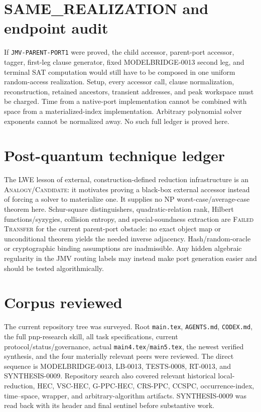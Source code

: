 \documentclass[11pt]{article}
\newcommand{\status}[1]{\textsc{#1}}
\begin{document}
\section{SAME\_REALIZATION and endpoint audit}

If \texttt{JMV-PARENT-PORT1} were proved, the child accessor, parent-port
accessor, tagger, first-leg clause generator, fixed MODELBRIDGE-0013 second
leg, and terminal SAT computation would still have to be composed in one
uniform random-access realization.  Setup, every accessor call, clause
normalization, reconstruction, retained ancestors, transient addresses, and
peak workspace must be charged.  Time from a native-port implementation
cannot be combined with space from a materialized-index implementation.
Arbitrary polynomial solver exponents cannot be normalized away.  No such
full ledger is proved here.

\section{Post-quantum technique ledger}

The LWE lesson of external, construction-defined reduction infrastructure is
an \status{Analogy/Candidate}: it motivates proving a black-box external
accessor instead of forcing a solver to materialize one.  It supplies no NP
worst-case/average-case theorem here.  Schur-square distinguishers,
quadratic-relation rank, Hilbert functions/syzygies, collision entropy, and
special-soundness extraction are \status{Failed Transfer} for the current
parent-port obstacle: no exact object map or unconditional theorem yields the
needed inverse adjacency.  Hash/random-oracle or cryptographic binding
assumptions are inadmissible.  Any hidden algebraic regularity in the JMV
routing labels may instead make port generation easier and should be tested
algorithmically.

\section{Corpus reviewed}

The current repository tree was surveyed.  Root \texttt{main.tex},
\texttt{AGENTS.md}, \texttt{CODEX.md}, the full pnp-research skill, all task
specifications, current protocol/status/governance, actual
\texttt{main4.tex}/\texttt{main5.tex}, the newest verified synthesis, and the
four materially relevant peers were reviewed.  The direct sequence is
MODELBRIDGE-0013, LB-0013, TESTS-0008, RT-0013, and SYNTHESIS-0009.  Repository
search also covered relevant historical local-reduction, HEC, VSC-HEC,
G-PPC-HEC, CRS-PPC, CCSPC, occurrence-index, time--space, wrapper, and
arbitrary-algorithm artifacts.  SYNTHESIS-0009 was read back with its header
and final sentinel before substantive work.
\end{document}
